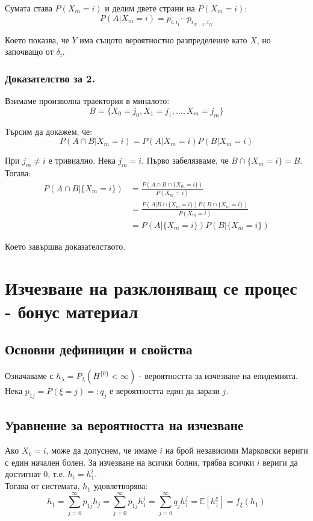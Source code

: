 \documentclass{article}
\begin{document}
Сумата става $P(X_m = i)$ и делим двете страни на $P(X_m = i)$:
$$P(A | X_m = i) = p_{i,i_1}\cdots p_{i_{N-1},i_N}$$

Което показва, че $Y$ има същото вероятностно разпределение като $X$, но започващо от $\delta_i$.

\subsubsection*{Доказателство за 2.}
Взимаме произволна траектория в миналото:
$$B = \{X_0 = j_0, X_1 = j_1, \dots, X_m = j_m\}$$

Търсим да докажем, че:
$$P(A \cap B | X_m = i) = P(A | X_m = i)P(B | X_m = i)$$

При $j_m\neq i$ е тривиално. Нека $j_m=i$.
Първо забелязваме, че $B \cap \{X_m = i\} = B$. Тогава:
\begin{align*}
P(A \cap B | \{X_m = i\}) &= \frac{P(A \cap B \cap \{X_m = i\})}{P(X_m = i)} \\
&= \frac{P(A | B \cap \{X_m = i\})P(B \cap \{X_m = i\})}{P(X_m = i)} \\
&= P(A | \{X_m = i\})P(B | \{X_m = i\})
\end{align*}

Което завършва доказателството.

\section{Изчезване на разклоняващ се процес - бонус материал}
\subsection{Основни дефиниции и свойства}
Означаваме с $h_\lambda = P_\lambda(H^{\{0\}} < \infty)$ - вероятността за изчезване на епидемията. \\ 
Нека $p_{1j} = P(\xi = j) =: q_j$ е вероятността един да зарази $j$.

\subsection{Уравнение за вероятността на изчезване}

Ако $X_0 = i$, може да допуснем, че имаме $i$ на брой независими Марковски вериги с един начален болен. 
За изчезване на всички болни, трябва всички $i$ вериги да достигнат 0, т.е. $h_i = h_1^i$. \\

Тогава от системата, $h_1$ удовлетворява:
$$ h_1 = \sum_{j=0}^\infty p_{1j} h_j = \sum_{j=0}^\infty p_{1j} h_1^j = \sum_{j=0}^\infty q_j h_1^j = \mathbb{E}[h_1^\xi]= f_\xi(h_1)$$
\end{document}
